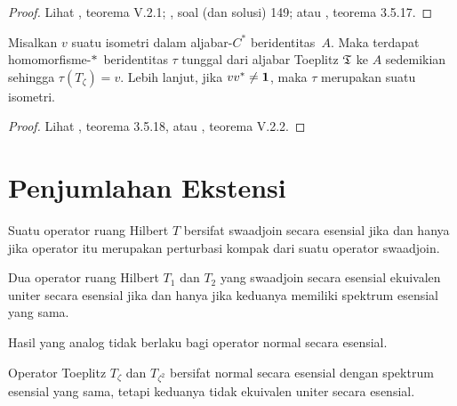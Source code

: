 \begin{proof} Lihat \cite{Davidson:1996}, teorema V.2.1; \cite{Halmos:1982}, soal (dan
solusi) 149; atau \cite{Murphy:1990}, teorema 3.5.17. \ns
\end{proof}

\begin{thm}[Coburn]
Misalkan $v$ suatu isometri dalam aljabar-$C^*$ beridentitas~$A$.
Maka
terdapat
homomorfisme-$*\,$
beridentitas
$\tau$ tunggal dari aljabar Toeplitz $\mathfrak{T}$ ke $A$ sedemikian sehingga
$\tau(T_\zeta) = v$. Lebih lanjut, jika $vv^* \ne \mathbf{1}$, maka $\tau$ merupakan suatu isometri.
\end{thm}

\begin{proof} Lihat \cite{Murphy:1990}, teorema 3.5.18, atau \cite{Davidson:1996},
teorema V.2.2. \ns
\end{proof}
%
 
  
 











\section{Penjumlahan Ekstensi}

\begin{center}
\end{center}

\begin{prop} Suatu operator ruang Hilbert $T$ bersifat swaadjoin secara esensial jika dan hanya jika
operator itu merupakan perturbasi kompak dari suatu operator swaadjoin.
\end{prop}

\begin{prop}\label{005414} Dua operator ruang Hilbert $T_1$ dan $T_2$ yang swaadjoin secara esensial
ekuivalen uniter secara esensial jika dan hanya jika keduanya memiliki spektrum esensial yang
sama.
\end{prop}

Hasil yang analog tidak berlaku bagi operator normal secara esensial.

\begin{exam} Operator Toeplitz $T_\zeta$ dan $T_{\zeta^2}$ bersifat normal secara esensial dengan
spektrum esensial yang sama, tetapi keduanya tidak ekuivalen uniter secara esensial.
\end{exam}

